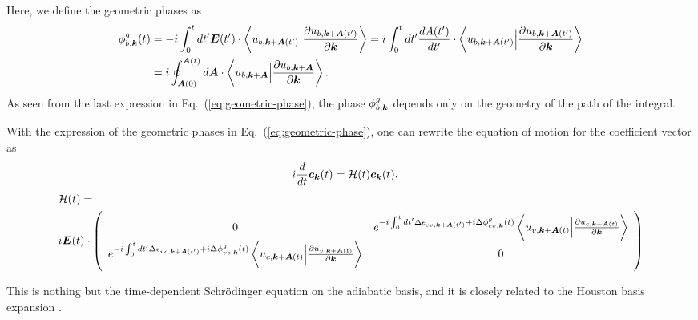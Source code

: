 Here, we define the geometric phases as
\begin{align}
\phi^g_{b,\boldsymbol k}(t) &= -i\int^t_0 dt' \boldsymbol E(t')\cdot 
\left \langle u_{b,\boldsymbol k+\boldsymbol A(t')}\Big |\frac{\partial u_{b,\boldsymbol k+\boldsymbol A(t')}}{\partial \boldsymbol k} \right \rangle
=i\int^t_0 dt' \frac{dA(t')}{dt'}\cdot 
\left \langle u_{b,\boldsymbol k+\boldsymbol A(t')}\Big |\frac{\partial u_{b,\boldsymbol k+\boldsymbol A(t')}}{\partial \boldsymbol k} \right \rangle \nonumber \\
&= i \oint^{\boldsymbol A(t)}_{\boldsymbol A(0)} d\boldsymbol A \cdot \left \langle u_{b,\boldsymbol k+\boldsymbol A}\Big |\frac{\partial u_{b,\boldsymbol k+\boldsymbol A}}{\partial \boldsymbol k} \right \rangle.
\label{eq;geometric-phase}
\end{align}
As seen from the last expression in Eq.~(\ref{eq;geometric-phase}), the phase $\phi^g_{b,\boldsymbol k}$ depends only on the geometry of the path of the integral.

With the expression of the geometric phases in Eq.~(\ref{eq;geometric-phase}), one can rewrite the equation of motion for the coefficient vector as
\begin{align}
&i\frac{d}{dt} \boldsymbol c_{\boldsymbol k}(t) = \mathcal{H}(t) \boldsymbol c_{\boldsymbol k}(t)
.
\label{eq:tdse-ad-basis}
\end{align}
\begin{align}
&\mathcal{H}(t)= 
 \nonumber \\
& i\boldsymbol E(t)\cdot \left(
    \begin{array}{cc}
      0 & 
      e^{-i\int^t_0dt' \Delta \epsilon_{cv,\boldsymbol k+ \boldsymbol A(t')}+i \Delta \phi^g_{cv,\boldsymbol k}(t)} 
  \left \langle u_{v,\boldsymbol k+\boldsymbol A(t)}\Big |\frac{\partial u_{c,\boldsymbol k+\boldsymbol A(t)}}{\partial \boldsymbol k} \right \rangle \\
      e^{-i\int^t_0dt' \Delta \epsilon_{vc,\boldsymbol k+ \boldsymbol A(t')}+i \Delta \phi^g_{vc,\boldsymbol k}(t)} 
  \left \langle u_{c,\boldsymbol k+\boldsymbol A(t)}\Big |\frac{\partial u_{v,\boldsymbol k+\boldsymbol A(t)}}{\partial \boldsymbol k} \right \rangle &
      0
    \end{array}
    \right)
\end{align}

This is nothing but the time-dependent Schr\"odinger equation on the adiabatic basis, and it is closely related to the Houston basis expansion \cite{PhysRev.57.184,PhysRevB.33.5494}. 
